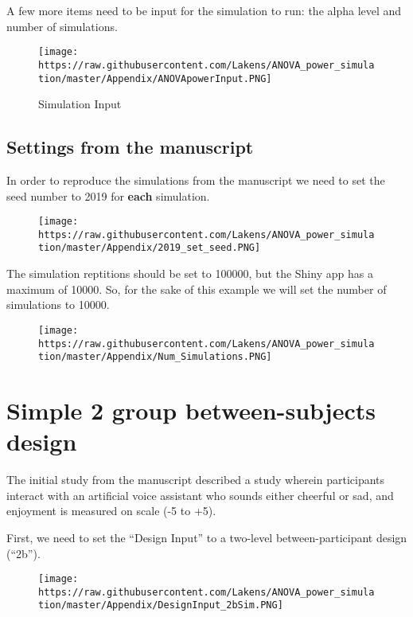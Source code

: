 \documentclass[]{article}
\begin{document}
A few more items need to be input for the simulation to run: the alpha
level and number of simulations.

\begin{figure}
\centering
\texttt{[image: https://raw.githubusercontent.com/Lakens/ANOVA\_power\_simulation/master/Appendix/ANOVApowerInput.PNG]}
\caption{Simulation Input}
\end{figure}

\subsection{Settings from the
manuscript}\label{settings-from-the-manuscript}

In order to reproduce the simulations from the manuscript we need to set
the seed number to 2019 for \textbf{each} simulation.

\begin{figure}
\centering
\texttt{[image: https://raw.githubusercontent.com/Lakens/ANOVA\_power\_simulation/master/Appendix/2019\_set\_seed.PNG]}
\caption{}
\end{figure}

The simulation reptitions should be set to 100000, but the Shiny app has
a maximum of 10000. So, for the sake of this example we will set the
number of simulations to 10000.

\begin{figure}
\centering
\texttt{[image: https://raw.githubusercontent.com/Lakens/ANOVA\_power\_simulation/master/Appendix/Num\_Simulations.PNG]}
\caption{}
\end{figure}

\section{Simple 2 group between-subjects
design}\label{simple-2-group-between-subjects-design}

The initial study from the manuscript described a study wherein
participants interact with an artificial voice assistant who sounds
either cheerful or sad, and enjoyment is measured on scale (-5 to +5).

First, we need to set the ``Design Input'' to a two-level
between-participant design (``2b'').

\begin{figure}
\centering
\texttt{[image: https://raw.githubusercontent.com/Lakens/ANOVA\_power\_simulation/master/Appendix/DesignInput\_2bSim.PNG]}
\caption{}
\end{figure}
\end{document}

